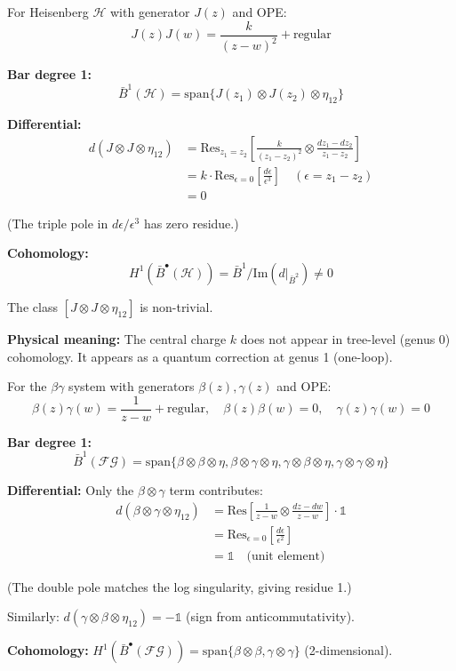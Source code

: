 \begin{example}\label{ex:heisenberg-deg1-complete}
For Heisenberg $\mathcal{H}$ with generator $J(z)$ and OPE:
$$J(z)J(w) = \frac{k}{(z-w)^2} + \text{regular}$$

\textbf{Bar degree 1:}
$$\bar{B}^1(\mathcal{H}) = \text{span}\{J(z_1) \otimes J(z_2) \otimes \eta_{12}\}$$

\textbf{Differential:}
\begin{align*}
d(J \otimes J \otimes \eta_{12}) &= \text{Res}_{z_1=z_2}\left[\frac{k}{(z_1-z_2)^2} \otimes \frac{dz_1-dz_2}{z_1-z_2}\right] \\
&= k \cdot \text{Res}_{\epsilon=0}\left[\frac{d\epsilon}{\epsilon^3}\right] \quad (\epsilon = z_1-z_2) \\
&= 0
\end{align*}

(The triple pole in $d\epsilon/\epsilon^3$ has zero residue.)

\textbf{Cohomology:}
$$H^1(\bar{B}^{\bullet}(\mathcal{H})) = \bar{B}^1 / \text{Im}(d|_{\bar{B}^2}) \neq 0$$

The class $[J \otimes J \otimes \eta_{12}]$ is non-trivial.

\textbf{Physical meaning:} The central charge $k$ does not appear in tree-level (genus 0) cohomology. It appears as a quantum correction at genus 1 (one-loop).
\end{example}

\begin{example}\label{ex:betagamma-deg1}
For the $\beta\gamma$ system with generators $\beta(z), \gamma(z)$ and OPE:
$$\beta(z)\gamma(w) = \frac{1}{z-w} + \text{regular}, \quad \beta(z)\beta(w) = 0, \quad \gamma(z)\gamma(w) = 0$$

\textbf{Bar degree 1:}
$$\bar{B}^1(\mathcal{FG}) = \text{span}\{\beta \otimes \beta \otimes \eta, \beta \otimes \gamma \otimes \eta, \gamma \otimes \beta \otimes \eta, \gamma \otimes \gamma \otimes \eta\}$$

\textbf{Differential:} Only the $\beta \otimes \gamma$ term contributes:
\begin{align*}
d(\beta \otimes \gamma \otimes \eta_{12}) &= \text{Res}\left[\frac{1}{z-w} \otimes \frac{dz-dw}{z-w}\right] \cdot \mathbb{1} \\
&= \text{Res}_{\epsilon=0}\left[\frac{d\epsilon}{\epsilon^2}\right] \\
&= \mathbb{1} \quad \text{(unit element)}
\end{align*}

(The double pole matches the log singularity, giving residue 1.)

Similarly: $d(\gamma \otimes \beta \otimes \eta_{12}) = -\mathbb{1}$ (sign from anticommutativity).

\textbf{Cohomology:} $H^1(\bar{B}^{\bullet}(\mathcal{FG})) = \text{span}\{\beta \otimes \beta, \gamma \otimes \gamma\}$ (2-dimensional).
\end{example}

